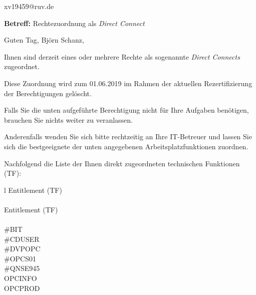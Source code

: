 \documentclass[a4paper,landscape,12pt]{letter}
\begin{document}
\begin{letter}{xv19459@ruv.de\hfill \break}
\begin{normalsize}
	\opening{\textbf{Betreff:} Rechtezuordnung als \emph{Direct Connect}}
	\begin{normalsize} \hfill
	\end{normalsize}

	\begin{normalsize}
		Guten Tag, 
	Björn Schanz, \hfill \break
	\end{normalsize}
	\end{normalsize}
	
\begin{normalsize}
	Ihnen sind derzeit eines oder mehrere Rechte als sogenannte \emph{Direct Connects} zugeordnet.
	
	Diese Zuordnung wird zum 01.06.2019 im Rahmen der aktuellen Rezertifizierung der Berechtigungen gelöscht.
	
	Falls Sie die unten aufgeführte Berechtigung nicht für Ihre Aufgaben benötigen, 
	brauchen Sie nichts weiter zu veranlassen.
	
	Anderenfalls wenden Sie sich bitte rechtzeitig an Ihre IT-Betreuer 
	und lassen Sie sich die bestgeeignete der unten angegebenen Arbeitsplatzfunktionen zuordnen.
	\end{normalsize}
	
\begin{normalsize}
	Nachfolgend die Liste der Ihnen direkt zugeordneten technischen Funktionen (TF):

	\begin{longtable}{l}
		Entitlement (TF) \\ \hline
		\endfirsthead
		\\\hline
		Entitlement (TF) \\ \hline
		\endhead %
		\multicolumn{1}{r@{}}{Fortsetzung \ldots}\\
		\endfoot
		\hline
		\endlastfoot
	\#BIT\\\#CDUSER\\\#DVPOPC\\\#OPCS01\\\#QNSE945\\OPCINFO\\OPCPROD\\
	\end{longtable}
	\end{normalsize}
	

\end{letter}
\end{document}
